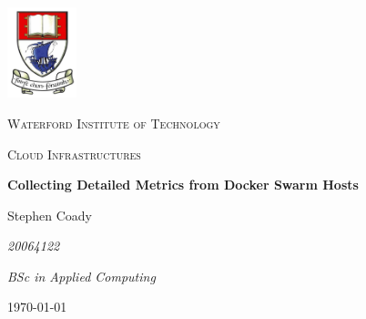 \begin{titlepage}
	\centering
	\includegraphics[width=0.15\textwidth]{components/images/wit}\par\vspace{1cm}
	{\scshape\LARGE Waterford Institute of Technology \par}
	\vspace{1cm}
	{\scshape\Large Cloud Infrastructures\par}
	\vspace{1.5cm}
	{\huge\bfseries Collecting Detailed Metrics from Docker Swarm Hosts\par}
	\vspace{2cm}
	{\Large Stephen Coady\par}
	{\Large\itshape 20064122\par}	
	{\Large\itshape BSc in Applied Computing\par}


	\vfill

	{\large \today\par}
\end{titlepage}
